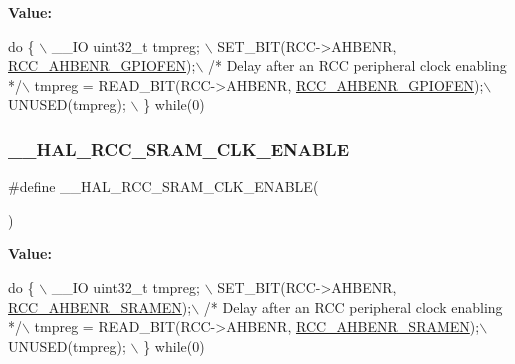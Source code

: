 {\bfseries Value\+:}
\begin{DoxyCode}
\textcolor{keywordflow}{do} \{ \(\backslash\)
                                        \_\_IO uint32\_t tmpreg; \(\backslash\)
                                        SET\_BIT(RCC->AHBENR, \hyperlink{group___peripheral___registers___bits___definition_ga9c0de1cc7b72b07f81bce3597a63dc39}{RCC\_AHBENR\_GPIOFEN});\(\backslash\)
                                        \textcolor{comment}{/* Delay after an RCC peripheral clock enabling */}\(\backslash\)
                                        tmpreg = READ\_BIT(RCC->AHBENR, 
      \hyperlink{group___peripheral___registers___bits___definition_ga9c0de1cc7b72b07f81bce3597a63dc39}{RCC\_AHBENR\_GPIOFEN});\(\backslash\)
                                        UNUSED(tmpreg); \(\backslash\)
                                      \} \textcolor{keywordflow}{while}(0)
\end{DoxyCode}
\mbox{\label{group___r_c_c___a_h_b___clock___enable___disable_ga93ba92ddc3fa1efc4d840a19795b6888}} 
\subsubsection{\texorpdfstring{\+\_\+\+\_\+\+H\+A\+L\+\_\+\+R\+C\+C\+\_\+\+S\+R\+A\+M\+\_\+\+C\+L\+K\+\_\+\+E\+N\+A\+B\+LE}{\_\_HAL\_RCC\_SRAM\_CLK\_ENABLE}}
{\footnotesize\ttfamily \#define \+\_\+\+\_\+\+H\+A\+L\+\_\+\+R\+C\+C\+\_\+\+S\+R\+A\+M\+\_\+\+C\+L\+K\+\_\+\+E\+N\+A\+B\+LE(\begin{DoxyParamCaption}{ }\end{DoxyParamCaption})}

{\bfseries Value\+:}
\begin{DoxyCode}
\textcolor{keywordflow}{do} \{ \(\backslash\)
                                        \_\_IO uint32\_t tmpreg; \(\backslash\)
                                        SET\_BIT(RCC->AHBENR, \hyperlink{group___peripheral___registers___bits___definition_ga295a704767cb94ee624cbc4dd4c4cd9a}{RCC\_AHBENR\_SRAMEN});\(\backslash\)
                                        \textcolor{comment}{/* Delay after an RCC peripheral clock enabling */}\(\backslash\)
                                        tmpreg = READ\_BIT(RCC->AHBENR, 
      \hyperlink{group___peripheral___registers___bits___definition_ga295a704767cb94ee624cbc4dd4c4cd9a}{RCC\_AHBENR\_SRAMEN});\(\backslash\)
                                        UNUSED(tmpreg); \(\backslash\)
                                      \} \textcolor{keywordflow}{while}(0)
\end{DoxyCode}
